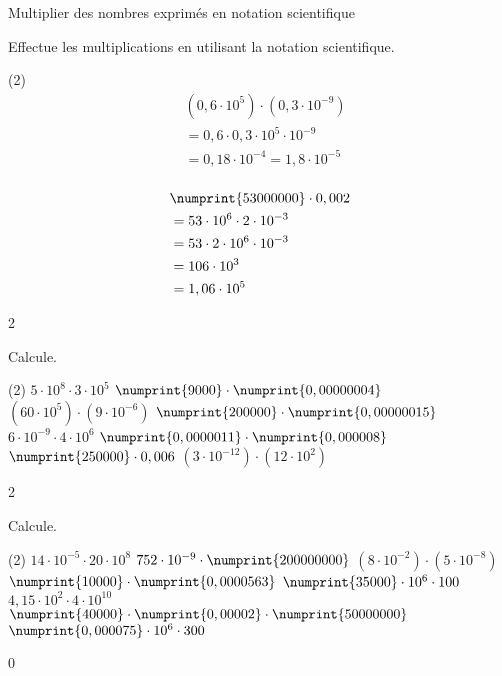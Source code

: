 \documentclass[a4paper,11pt]{report}
\begin{document}
\begin{resolu}{Multiplier des nombres exprimés en notation scientifique}{
Effectue les multiplications en utilisant la notation scientifique.
\begin{tasks}(2)
    \task \addtolength{\jot}{3mm}    
            \begin{align*}
            &(0,6\cdot10^5)\cdot(0,3\cdot10^{-9})\\
            &=0,6\cdot0,3\cdot10^5\cdot10^{-9}\\
            &=0,18\cdot10^{-4}=1,8\cdot10^{-5}\\
            \end{align*}
            
    
    \task \addtolength{\jot}{3mm}    
            \begin{align*}
            &\numprint{53000000}\cdot0,002\\
            &=53\cdot10^6\cdot2\cdot10^{-3}\\
            &=53\cdot2\cdot10^6\cdot10^{-3}\\
            &=106\cdot10^3\\
            &=1,06\cdot10^5
            \end{align*}
             
\end{tasks}
}{2}    
\end{resolu}

\begin{exo}{
Calcule.
\begin{tasks}(2)
    \task $5\cdot10^8\cdot3\cdot10^5$
    \task $\numprint{9000}\cdot\numprint{0,00000004}$
    \task $(60\cdot10^5)\cdot(9\cdot10^{-6})$
    \task $\numprint{200000}\cdot\numprint{0,00000015}$
    \task $6\cdot10^{-9}\cdot4\cdot10^6$
    \task $\numprint{0,0000011}\cdot\numprint{0,000008}$
    \task $\numprint{250000}\cdot0,006$
    \task $(3\cdot10^{-12})\cdot(12\cdot10^2)$
\end{tasks}
}{2}    
\end{exo}

\begin{exo}{
Calcule.
\begin{tasks}(2)
    \task $14\cdot10^{-5}\cdot20\cdot10^8$
    \task $752\cdot10^{-9}\cdot\numprint{200000000}$
    \task $(8\cdot10^{-2})\cdot(5\cdot10^{-8})$
    \task $\numprint{10000}\cdot\numprint{0,0000563}$
    \task $\numprint{35000}\cdot10^6\cdot100$
    \task $4,15\cdot10^2\cdot4\cdot10^{10}$
    \task $\numprint{40000}\cdot\numprint{0,00002}\cdot\numprint{50000000}$
    \task $\numprint{0,000075}\cdot10^6\cdot300$
\end{tasks}
}{0}    
\end{exo}
\end{document}
